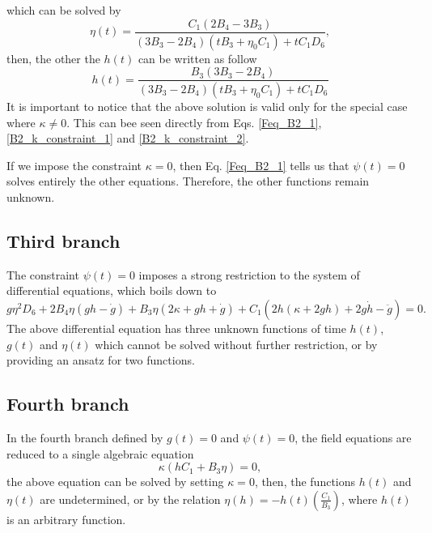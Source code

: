 which can be solved by
\begin{equation}
    \eta(t) = \frac{C_1\left(2B_4 - 3B_3\right)}{\left(3B_3 - 2B_4\right)\left(tB_3 + \eta_0 C_1\right) + tC_1D_6},
\end{equation}
then, the other the $h(t)$ can be written as follow
\begin{equation}
    h(t) = \frac{B_3\left(3B_3 - 2B_4\right)}{\left(3B_3 - 2B_4\right)\left(tB_3 + \eta_0 C_1\right) + tC_1D_6} 
\end{equation}
It is important to notice that the above solution is valid only for the special case where $\kappa \neq 0$.
This can bee seen directly from Eqs. \eqref{Feq_B2_1}, \eqref{B2_k_constraint_1} and \eqref{B2_k_constraint_2}. 

If we impose the constraint $\kappa = 0$, then Eq. \eqref{Feq_B2_1} tells us that $\psi(t) = 0$ solves entirely the other
equations. Therefore, the other functions remain unknown.

\subsection{Third branch}

The constraint $\psi(t)=0$ imposes a strong restriction to the system of differential equations, which boils down to 
\begin{dmath}
    g\eta^2D_6 + 2B_4\eta \left(gh - \dot{g}\right) + B_3\eta\left(2\kappa + gh + \dot{g}\right) + 
    C_1\left(2h\left(\kappa + 2gh\right) + 2g\dot{h} - \ddot{g}\right) = 0.
\end{dmath}
The above differential equation has three unknown functions of time $h(t)$, $g(t)$ and $\eta(t)$ which cannot be solved without 
further restriction, or by providing an ansatz for two functions.

\subsection{Fourth branch}

In the fourth branch defined by $g(t) = 0$ and $\psi (t) = 0$, the field equations are reduced
to a single algebraic equation
\begin{equation}
    \kappa\left(hC_1 + B_3\eta\right) = 0,
\end{equation}
the above equation can be solved by setting $\kappa = 0$, then, the functions $h(t)$ and $\eta(t)$ are undetermined,
or by the relation $\eta(h) = - h(t)\left(\frac{C_1}{B_3}\right)$, where $h(t)$ is an arbitrary function.

